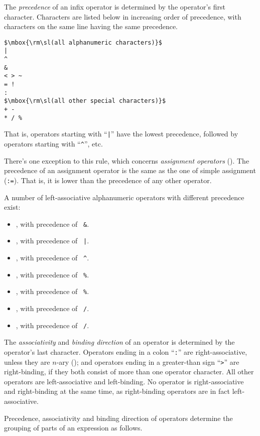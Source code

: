 The {\em precedence} of an infix operator is determined by the operator's first character. Characters are listed below in increasing order of precedence, with characters on the same line having the same precedence.

\begin{lstlisting}
$\mbox{\rm\sl(all alphanumeric characters)}$
|
^
&
< > ~
= !
:
$\mbox{\rm\sl(all other special characters)}$
+ -
* / %
\end{lstlisting}

That is, operators starting with ``\lstinline!|!'' have the lowest precedence, followed by operators starting with ``\lstinline!^!'', etc. 

There's one exception to this rule, which concerns {\em assignment operators} (). The precedence of an assignment operator is the same as the one of simple assignment (\lstinline!:=!). That is, it is lower than the precedence of any other operator. 

A number of left-associative alphanumeric operators with different precedence exist:
\begin{itemize}
  \item {}, with precedence of ~\lstinline!&!. 
  \item {}, with precedence of ~\lstinline!|!.  
  \item {}, with precedence of ~\lstinline!^!.  
  \item {}, with precedence of ~\lstinline!%!. 
  \item {}, with precedence of ~\lstinline!%!. 
  \item {}, with precedence of ~\lstinline!/!. 
  \item {}, with precedence of ~\lstinline!/!.   
\end{itemize}

The {\em associativity} and {\em binding direction} of an operator is determined by the operator's last character. Operators ending in a colon ``\lstinline!:!'' are right-associative, unless they are $n$-ary (); and operators ending in a greater-than sign ``\lstinline!>!'' are right-binding, if they both consist of more than one operator character. All other operators are left-associative and left-binding. No operator is right-associative and right-binding at the same time, as right-binding operators are in fact left-associative. 

Precedence, associativity and binding direction of operators determine the grouping of parts of an expression as follows.

